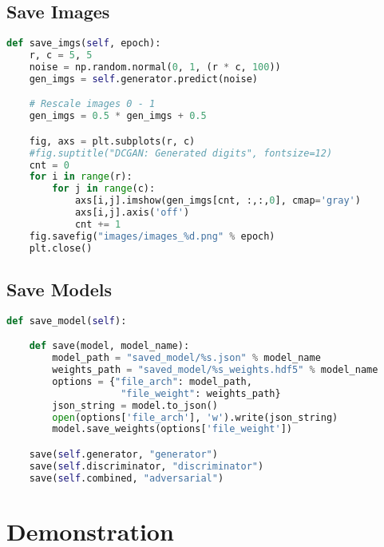 \subsection{Save Images} %
\label{subsec:save_imgs}
\begin{lstlisting}[basicstyle=\scriptsize,language=Python]
def save_imgs(self, epoch):
    r, c = 5, 5
    noise = np.random.normal(0, 1, (r * c, 100))
    gen_imgs = self.generator.predict(noise)

    # Rescale images 0 - 1
    gen_imgs = 0.5 * gen_imgs + 0.5

    fig, axs = plt.subplots(r, c)
    #fig.suptitle("DCGAN: Generated digits", fontsize=12)
    cnt = 0
    for i in range(r):
        for j in range(c):
            axs[i,j].imshow(gen_imgs[cnt, :,:,0], cmap='gray')
            axs[i,j].axis('off')
            cnt += 1
    fig.savefig("images/images_%d.png" % epoch)
    plt.close()
\end{lstlisting}
\par\bigskip

\subsection{Save Models} %
\label{sub:saving_models}
\begin{lstlisting}[basicstyle=\scriptsize,language=Python]
def save_model(self):

    def save(model, model_name):
        model_path = "saved_model/%s.json" % model_name
        weights_path = "saved_model/%s_weights.hdf5" % model_name
        options = {"file_arch": model_path,
                    "file_weight": weights_path}
        json_string = model.to_json()
        open(options['file_arch'], 'w').write(json_string)
        model.save_weights(options['file_weight'])

    save(self.generator, "generator")
    save(self.discriminator, "discriminator")
    save(self.combined, "adversarial")
\end{lstlisting}
\par\bigskip


\section{Demonstration} %
\label{sec:code_demonstration}

